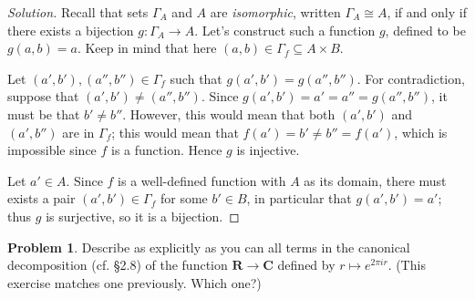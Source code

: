 \documentclass[fontsize=14pt]{scrartcl}
\theoremstyle{definition}
\newtheorem{problem-internal}{Problem}[subsection]
\newenvironment{problem}{
  \medskip
  \begin{problem-internal}
}{
  \end{problem-internal}
}
\newenvironment{solution}{
  \begin{proof}[Solution]
  \vspace{-8px}
  \setlength{\parskip}{4px}
  \setlength{\parindent}{0px}
}{
  \end{proof}
}
\begin{document}
\begin{solution}
Recall that sets $\Gamma_A$ and $A$ are \textit{isomorphic}, written
$\Gamma_A\cong A$, if and only if there exists a bijection $g:\Gamma_A\to A$.
Let's construct such a function $g$, defined to be $g(a,b) = a$. Keep in mind
that here $(a,b)\in\Gamma_f\subseteq A\times B$.

Let $(a',b'),(a'',b'')\in\Gamma_f$ such that $g(a',b') = g(a'',b'')$. For
contradiction, suppose that $(a',b')\neq (a'',b'')$. Since $g(a',b') = a' = a''
= g(a'',b'')$, it must be that $b'\neq b''$. However, this would mean that both
$(a',b')$ and $(a',b'')$ are in $\Gamma_f$; this would mean that $f(a') = b'
\neq b'' = f(a')$, which is impossible since $f$ is a function. Hence $g$ is
injective.

Let $a'\in A$. Since $f$ is a well-defined function with $A$ as its domain,
there must exists a pair $(a',b')\in\Gamma_f$ for some $b'\in B$, in particular
that $g(a',b') = a'$; thus $g$ is surjective, so it is a bijection.
\end{solution}


\begin{problem}
Describe as explicitly as you can all terms in the canonical decomposition (cf.
\S2.8) of the function $\mathbf{R}\to\mathbf{C}$ defined by $r\mapsto e^{2\pi
ir}$. (This exercise matches one previously. Which one?)
\end{problem}
\end{document}
